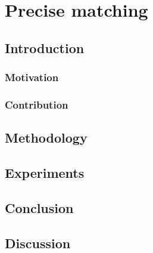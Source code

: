 
\chapter{Precise matching}
\label{chap:intro}
\minitoc

\section{Introduction}
\subsection{Motivation}
\subsection{Contribution}

\section{Methodology}

\section{Experiments}

\section{Conclusion}

\section{Discussion}
